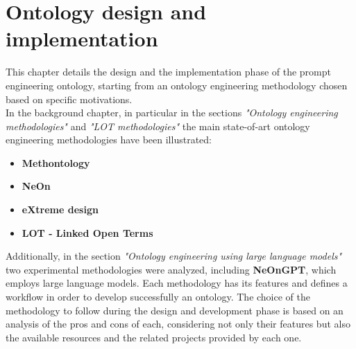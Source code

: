 \chapter{Ontology design and implementation}
This chapter details the design and the implementation phase of the prompt engineering ontology, starting from an ontology engineering methodology chosen based on specific motivations.\\
In the background chapter, in particular in the sections \textit{"Ontology engineering methodologies"} and \textit{"LOT methodologies"} the main state-of-art ontology engineering methodologies have been illustrated:
\begin{itemize}
    \item \textbf{Methontology}
    \item \textbf{NeOn}
    \item \textbf{eXtreme design}
    \item \textbf{LOT - Linked Open Terms}
\end{itemize}
Additionally, in the section \textit{"Ontology engineering using large language models"} two experimental methodologies were analyzed, including \textbf{NeOnGPT}, which employs large language models. Each methodology has its features and defines a workflow in order to develop successfully an ontology. The choice of the methodology to follow during the design and development phase is based on an analysis of the pros and cons of each, considering not only their features but also the available resources and the related projects provided by each one. \\
